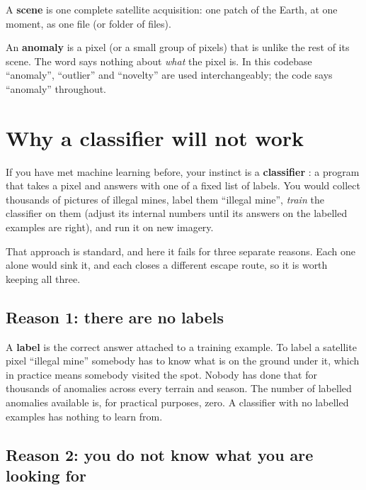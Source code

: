 \begin{definition}[Scene]
A \textbf{scene} is one complete satellite acquisition: one patch of the Earth, at one moment,
as one file (or folder of files).
\end{definition}

\begin{definition}[Anomaly]
An \textbf{anomaly} is a pixel (or a small group of pixels) that is unlike the rest of its
scene. The word says nothing about \emph{what} the pixel is. In this codebase ``anomaly'',
``outlier'' and ``novelty'' are used interchangeably; the code says ``anomaly'' throughout.
\end{definition}

\section{Why a classifier will not work}\label{sec:problem:classifier}

If you have met machine learning before, your instinct is a \textbf{classifier}%
: a program that takes a pixel and answers with one of a fixed list of
labels. You would collect thousands of pictures of illegal mines, label them ``illegal mine'',
\emph{train} the classifier on them (adjust its internal numbers until its answers on the
labelled examples are right), and run it on new imagery.

That approach is standard, and here it fails for three separate reasons. Each one alone would
sink it, and each closes a different escape route, so it is worth keeping all three.

\subsection{Reason 1: there are no labels}

A \textbf{label} is the correct answer attached to a training example. To label a
satellite pixel ``illegal mine'' somebody has to know what is on the ground under it, which in
practice means somebody visited the spot. Nobody has done that for thousands of anomalies across
every terrain and season. The number of labelled anomalies available is, for practical purposes,
zero. A classifier with no labelled examples has nothing to learn from.

\subsection{Reason 2: you do not know what you are looking for}

